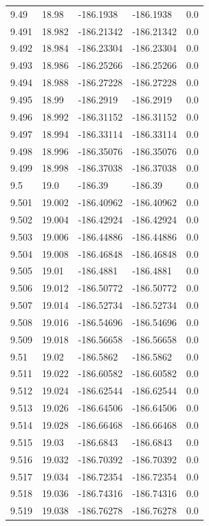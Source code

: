 \begin{tabular}{lllll}
9.49 & 18.98 & -186.1938 & -186.1938 & 0.0 \\
9.491 & 18.982 & -186.21342 & -186.21342 & 0.0 \\
9.492 & 18.984 & -186.23304 & -186.23304 & 0.0 \\
9.493 & 18.986 & -186.25266 & -186.25266 & 0.0 \\
9.494 & 18.988 & -186.27228 & -186.27228 & 0.0 \\
9.495 & 18.99 & -186.2919 & -186.2919 & 0.0 \\
9.496 & 18.992 & -186.31152 & -186.31152 & 0.0 \\
9.497 & 18.994 & -186.33114 & -186.33114 & 0.0 \\
9.498 & 18.996 & -186.35076 & -186.35076 & 0.0 \\
9.499 & 18.998 & -186.37038 & -186.37038 & 0.0 \\
9.5 & 19.0 & -186.39 & -186.39 & 0.0 \\
9.501 & 19.002 & -186.40962 & -186.40962 & 0.0 \\
9.502 & 19.004 & -186.42924 & -186.42924 & 0.0 \\
9.503 & 19.006 & -186.44886 & -186.44886 & 0.0 \\
9.504 & 19.008 & -186.46848 & -186.46848 & 0.0 \\
9.505 & 19.01 & -186.4881 & -186.4881 & 0.0 \\
9.506 & 19.012 & -186.50772 & -186.50772 & 0.0 \\
9.507 & 19.014 & -186.52734 & -186.52734 & 0.0 \\
9.508 & 19.016 & -186.54696 & -186.54696 & 0.0 \\
9.509 & 19.018 & -186.56658 & -186.56658 & 0.0 \\
9.51 & 19.02 & -186.5862 & -186.5862 & 0.0 \\
9.511 & 19.022 & -186.60582 & -186.60582 & 0.0 \\
9.512 & 19.024 & -186.62544 & -186.62544 & 0.0 \\
9.513 & 19.026 & -186.64506 & -186.64506 & 0.0 \\
9.514 & 19.028 & -186.66468 & -186.66468 & 0.0 \\
9.515 & 19.03 & -186.6843 & -186.6843 & 0.0 \\
9.516 & 19.032 & -186.70392 & -186.70392 & 0.0 \\
9.517 & 19.034 & -186.72354 & -186.72354 & 0.0 \\
9.518 & 19.036 & -186.74316 & -186.74316 & 0.0 \\
9.519 & 19.038 & -186.76278 & -186.76278 & 0.0 \\

\end{tabular}
